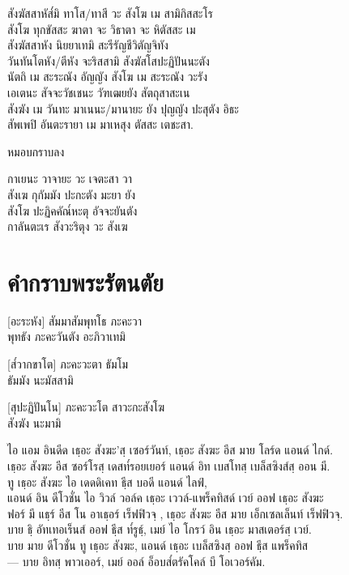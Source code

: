 สังฆัสสาหัส๎มิ ทาโส/ทาสี วะ สังโฆ เม สามิกิสสะโร\\
สังโฆ ทุกขัสสะ ฆาตา จะ วิธาตา จะ หิตัสสะ เม\\
สังฆัสสาหัง นิยยาเทมิ สะรีรัญชีวิตัญจิทัง\\
วันทันโตหัง/ตีหัง จะริสสามิ สังฆัสโสปะฏิปันนะตัง\\
นัตถิ เม สะระณัง อัญญัง สังโฆ เม สะระณัง วะรัง\\
เอเตนะ สัจจะวัชเชนะ วัฑเฒยยัง สัตถุสาสะเน\\
สังฆัง เม วันทะ มาเนนะ/มานายะ ยัง ปุญญัง ปะสุตัง อิธะ\\
สัพเพปิ อันตะรายา เม มาเหสุง ตัสสะ เตชะสา.\\

\begin{instruction}
หมอบกราบลง
\end{instruction}

กาเยนะ วาจายะ วะ เจตะสา วา\\
สังเฆ กุกัมมัง ปะกะตัง มะยา ยัง\\
สังโฆ ปะฏิคคัณ๎หะตุ อัจจะยันตัง\\
กาลันตะเร สังวะริตุง วะ สังเฆ\\

\chapter{คำกราบพระรัตนตัย}

[อะระหัง] สัมมาสัมพุทโธ ภะคะวา\\
\vin พุทธัง ภะคะวันตัง อะภิวาเทมิ

[ส๎วากขาโต] ภะคะวะตา ธัมโม\\
\vin ธัมมัง นะมัสสามิ

[สุปะฏิปันโน] ภะคะวะโต สาวะกะสังโฆ\\
\vin สังฆัง นะมามิ
\clearpage

\begin{thaitrans}
ไอ แอม อินดีด เธฺอะ สังฆะ’สฺ  เซอร์วันท์, เธฺอะ สังฆะ อีส มาย โลร์ด แอนด์ ไกด์.\\
เธฺอะ สังฆะ อีส ซอร์โรสฺ  เดสท๎รอยเยอร์ แอนด์ อิท เบสโทสฺ  เบล็สซิงส์สฺ ออน มี.\\
ทู เธฺอะ สังฆะ ไอ เดดดิเคท ธฺีส บอดี แอนด์ ไลฟ์,\\
แอนด์ อิน ดีโวชั่น ไอ วิวล์ วอล์ค เธฺอะ เววล์-แพร็คทิสด์ เวย์ ออฟ เธฺอะ สังฆะ\\
ฟอร์ มี แธฺร์ อีส โน อาเธฺอร์ เร็ฟฟิวจฺ , เธฺอะ สังฆะ อีส มาย เอ็กเซลเล็นท์ เร็ฟฟิวจฺ.\\
บาย ธฺิ  อัทเทอเร็นส์ ออฟ ธฺีส ท๎รูธฺ์, เมย์ ไอ โกรว์ อิน เธฺอะ มาสเตอร์สฺ เวย์.\\
บาย มาย ดีโวชั่น ทู เธฺอะ สังฆะ, แอนด์ เธฺอะ เบล็สซิงสฺ ออฟ ธฺีส แพร็คทิส\\—
บาย อิทสฺ  พาวเออร์, เมย์ ออล์ อ็อบส๎ตรัคโคล์ บี โอเวอร์คัม.\\
\end{thaitrans}

